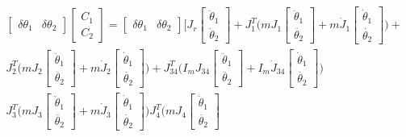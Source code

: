 \begin{equation*}
\begin{split}
\begin{bmatrix}
\delta \theta_1 & \delta \theta_2
\end{bmatrix}\begin{bmatrix}
C_1 \\ C_2
\end{bmatrix} =\begin{bmatrix}
\delta \theta_1 & \delta \theta_2
\end{bmatrix} \Bigg[ J_r\begin{bmatrix}
\ddot{\theta}_1 \\ \ddot{\theta}_2
\end{bmatrix}+ J_1^T \bigg( mJ_1\begin{bmatrix}
\ddot{\theta}_1 \\ \ddot{\theta_2}
\end{bmatrix}+m\dot{J}_1 \begin{bmatrix}
\dot{\theta}_1 \\\dot{\theta_2}
\end{bmatrix}\bigg) +
 \\J_2^T \bigg( mJ_2\begin{bmatrix}
\ddot{\theta}_1 \\ \ddot{\theta_2}
\end{bmatrix}+m\dot{J}_2 \begin{bmatrix}
\dot{\theta}_1 \\ \dot{\theta_2}
\end{bmatrix} \bigg)  +J_{34}^T \bigg( I_mJ_{34}\begin{bmatrix}
\ddot{\theta}_1 \\ \ddot{\theta_2}
\end{bmatrix}+I_m\dot{J}_{34} \begin{bmatrix}
\dot{\theta}_1 \\ \dot{\theta_2}
\end{bmatrix} \bigg) \\ J_3^T \bigg( mJ_3\begin{bmatrix}
\ddot{\theta}_1 \\ \ddot{\theta_2}
\end{bmatrix}+m\dot{J}_3 \begin{bmatrix}
\dot{\theta}_1 \\ \dot{\theta_2}
\end{bmatrix} \bigg) J_4^T \bigg( mJ_4\begin{bmatrix}
\ddot{\theta}_1 \\ \ddot{\theta_2}

\end{bmatrix}
\end{split}
\end{equation*}
